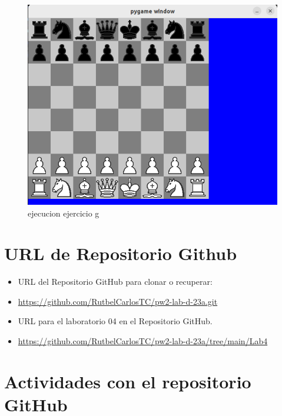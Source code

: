 \documentclass{article}
\begin{document}
\begin{figure}[H]
    \centering
    \includegraphics[scale=0.3]{img/capturaEjercicio2g.png}
    \caption{ejecucion ejercicio g}
\end{figure}




\section{URL de Repositorio Github}
\begin{itemize}
	\item URL del Repositorio GitHub para clonar o recuperar:
	\item \url{https://github.com/RutbelCarlosTC/pw2-lab-d-23a.git}
	\item URL para el laboratorio 04 en el Repositorio GitHub.
	\item \url{https://github.com/RutbelCarlosTC/pw2-lab-d-23a/tree/main/Lab4}
\end{itemize}

\section{Actividades con el repositorio GitHub}
\end{document}

